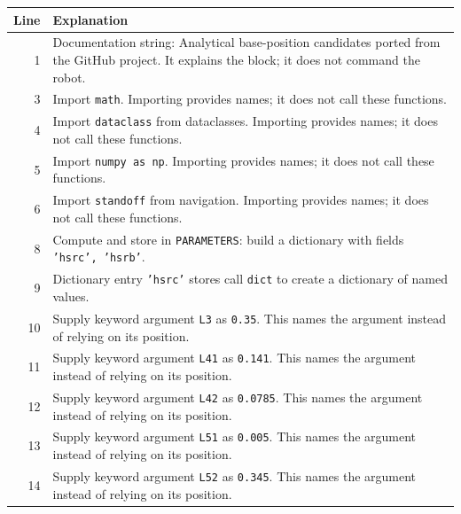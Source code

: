 \documentclass[11pt,a4paper]{book}
\begin{document}
\begin{longtable}{r p{}}

\textbf{Line} & \textbf{Explanation} \\ \hline \endhead

1 & Documentation string: Analytical base-position candidates ported from the GitHub project. It explains the block; it does not command the robot. \\

3 & Import \texttt{math}. Importing provides names; it does not call these functions. \\

4 & Import \texttt{dataclass} from dataclasses. Importing provides names; it does not call these functions. \\

5 & Import \texttt{numpy as np}. Importing provides names; it does not call these functions. \\

6 & Import \texttt{standoff} from navigation. Importing provides names; it does not call these functions. \\

8 & Compute and store in \texttt{PARAMETERS}: build a dictionary with fields \texttt{'hsrc', 'hsrb'}.  \\

9 & Dictionary entry \texttt{'hsrc'} stores call \texttt{dict} to create a dictionary of named values. \\

10 & Supply keyword argument \texttt{L3} as \texttt{0.35}. This names the argument instead of relying on its position. \\

11 & Supply keyword argument \texttt{L41} as \texttt{0.141}. This names the argument instead of relying on its position. \\

12 & Supply keyword argument \texttt{L42} as \texttt{0.0785}. This names the argument instead of relying on its position. \\

13 & Supply keyword argument \texttt{L51} as \texttt{0.005}. This names the argument instead of relying on its position. \\

14 & Supply keyword argument \texttt{L52} as \texttt{0.345}. This names the argument instead of relying on its position. \\


\end{longtable}
\end{document}

